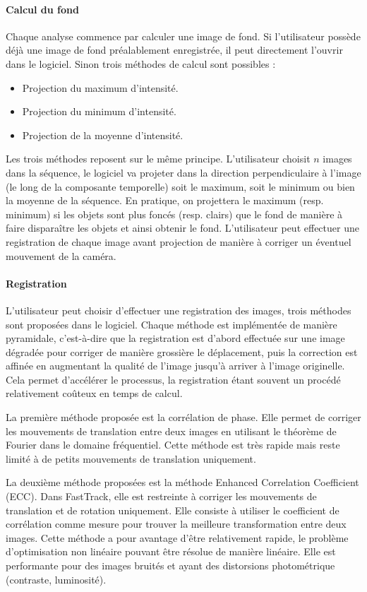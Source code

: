 		\paragraph{Calcul du fond}
		Chaque analyse commence par calculer une image de fond. Si l'utilisateur possède déjà une image de fond préalablement enregistrée, il peut directement l'ouvrir dans le logiciel. Sinon trois méthodes de calcul sont possibles :
		\begin{itemize}
			\item Projection du maximum d'intensité.
			\item Projection du minimum d'intensité.
			\item Projection de la moyenne d'intensité.		
		\end{itemize}
		Les trois méthodes reposent sur le même principe. L'utilisateur choisit $n$ images dans la séquence, le logiciel va projeter dans la direction perpendiculaire à l'image (le long de la composante temporelle) soit le maximum, soit le minimum ou bien la moyenne de la séquence. En pratique, on projettera le maximum (resp. minimum) si les objets sont plus foncés (resp. clairs) que le fond de manière à faire disparaître les objets et ainsi obtenir le fond. L'utilisateur peut effectuer une registration de chaque image avant projection de manière à corriger un éventuel mouvement de la caméra.
		
		
		\paragraph{Registration}
		L'utilisateur peut choisir d'effectuer une registration des images, trois méthodes sont proposées dans le logiciel. Chaque méthode est implémentée de manière pyramidale, c’est-à-dire que la registration est d'abord effectuée sur une image dégradée pour corriger de manière grossière le déplacement, puis la correction est affinée en augmentant la qualité de l'image jusqu'à arriver à l'image originelle. Cela permet d'accélérer le processus, la registration étant souvent un procédé relativement coûteux en temps de calcul.
\medbreak
		
		La première méthode proposée est la corrélation de phase. Elle permet de corriger les mouvements de translation entre deux images en utilisant le théorème de Fourier dans le domaine fréquentiel. Cette méthode est très rapide mais reste limité à de petits mouvements de translation uniquement.
\medbreak
		
		La deuxième méthode proposées est la méthode Enhanced Correlation Coefficient (ECC). Dans FastTrack, elle est restreinte à corriger les mouvements de translation et de rotation uniquement. Elle consiste à utiliser le coefficient de corrélation comme mesure pour trouver la meilleure transformation entre deux images. Cette méthode a pour avantage d'être relativement rapide, le problème d'optimisation non linéaire pouvant être résolue de manière linéaire. Elle est performante pour des images bruités et ayant des distorsions photométrique (contraste, luminosité).
\medbreak
		
